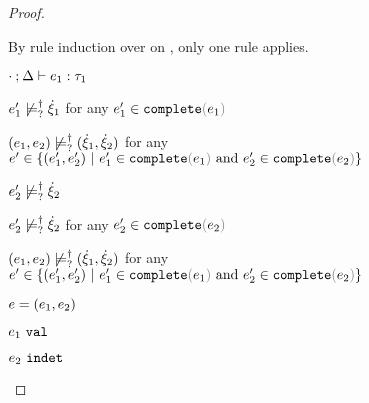 \begin{proof}
\begin{byCases}
\begin{byCases}
\begin{byCases}
\begin{pfsteps*}
        \end{pfsteps*}
        By rule induction over  on , only one rule applies.
        \begin{byCases}
          \item[\text{(\ref{rule:TPair})}]
          \begin{pfsteps*}
          \item $\cdot \mathbin{;} \Delta \vdash e_1 : \tau_1$  
          \item $e_1' \not\models_{?}^{\dag} \dot{\xi}_1$ for any $e_1' \in \expcomplete{e_1}$  
          \item $(e_1 , e_2) \not\models_{?}^{\dag} (\dot{\xi}_1 , \dot{\xi}_2)$ for any $e' \in \{\hpair{e_1'}{e_2'} ~\vert~ e_1' \in \expcomplete{e_1} \textand e_2' \in \expcomplete{e_2}\}$ 
          \end{pfsteps*} 
        \end{byCases}
        \item[\cnotsatisfyormay{e_2}{\hxi_2}]
        \begin{pfsteps*}
        \item $e_2' \not\models_{?}^{\dag} \dot{\xi}_2$  
        \item $e_2' \not\models_{?}^{\dag} \dot{\xi}_2$ for any $e_2' \in \expcomplete{e_2}$  
        \item $(e_1 , e_2) \not\models_{?}^{\dag} (\dot{\xi}_1 , \dot{\xi}_2)$ for any $e' \in \{\hpair{e_1'}{e_2'} ~\vert~ e_1' \in \expcomplete{e_1} \textand e_2' \in \expcomplete{e_2}\}$ 
        \end{pfsteps*} 
      \end{byCases}
      \item[\text{(\ref{rule:IPairR})}] 
      \begin{pfsteps*}
      \item $e=(e_1 , e_2)$ 
      \item $e_1 ~\mathtt{val}$  
      \item $e_2 ~\mathtt{indet}$  

\end{pfsteps*}
\end{byCases}
\end{byCases}
\end{proof}
